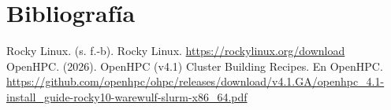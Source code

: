 \section{Bibliografía}
\label{sec:bibliografia}

Rocky Linux. (s. f.-b). Rocky Linux. \url{https://rockylinux.org/download} 
\\
OpenHPC. (2026). OpenHPC (v4.1) Cluster Building Recipes. En OpenHPC.
\url{https://github.com/openhpc/ohpc/releases/download/v4.1.GA/openhpc_4.1-install_guide-rocky10-warewulf-slurm-x86_64.pdf}


